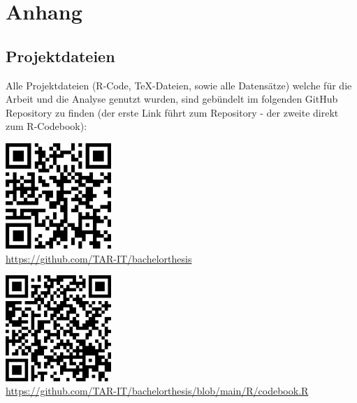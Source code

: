 
\section{Anhang}


\subsection{Projektdateien}

Alle Projektdateien (R-Code, TeX-Dateien, sowie alle Datensätze) welche für die Arbeit und die 
Analyse genutzt wurden, sind gebündelt im folgenden GitHub Repository zu finden (der erste Link 
führt zum Repository - der zweite direkt zum R-Codebook):

\vspace{2cm}

\begin{center}
    \includegraphics[width=0.3\textwidth]{assets/qrcode_repository.png}\\
    \small\url{https://github.com/TAR-IT/bachelorthesis}
\end{center}

\vspace{2cm}

\begin{center}
    \includegraphics[width=0.3\textwidth]{assets/qrcode_codebook.png}\\
    \small\url{https://github.com/TAR-IT/bachelorthesis/blob/main/R/codebook.R}
\end{center}
\newpage


